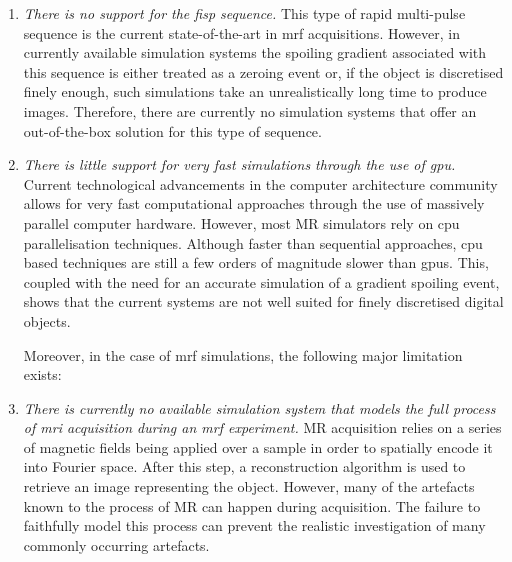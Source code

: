 \begin{enumerate}
    \item \textit{There is no support for the \ac{fisp} sequence.}
    This type of rapid multi-pulse sequence is the current state-of-the-art in \ac{mrf} acquisitions.
    However, in currently available simulation systems the spoiling gradient associated with this sequence is either treated as a zeroing event or, if the object is discretised finely enough, such simulations take an unrealistically long time to produce images.
    Therefore, there are currently no simulation systems that offer an out-of-the-box solution for this type of sequence.
    
    
    \item \textit{There is little support for very fast simulations through the use of \ac{gpu}.}
    Current technological advancements in the computer architecture community allows for very fast computational approaches through the use of massively parallel computer hardware.
    However, most MR simulators rely on \ac{cpu} parallelisation techniques.
    Although faster than sequential approaches, \ac{cpu} based techniques are still a few orders of magnitude slower than \ac{gpu}s.
    This, coupled with the need for an accurate simulation of a gradient spoiling event, shows that the current systems are not well suited for finely discretised digital objects. \\

    \hfill

	Moreover, in the case of \ac{mrf} simulations, the following major limitation exists: \\

    \item \textit{There is currently no available simulation system that models the full process of \ac{mri} acquisition during an \ac{mrf} experiment.}
    MR acquisition relies on a series of magnetic fields being applied over a sample in order to spatially encode it into Fourier space.
    After this step, a reconstruction algorithm is used to retrieve an image representing the object.
    However, many of the artefacts known to the process of MR can happen during acquisition.
    The failure to faithfully model this process can prevent the realistic investigation of many commonly occurring artefacts.
\end{enumerate}

